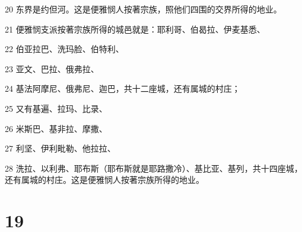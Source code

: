\par 20 东界是约但河。这是便雅悯人按著宗族，照他们四围的交界所得的地业。
\par 21 便雅悯支派按著宗族所得的城邑就是：耶利哥、伯曷拉、伊麦基悉、
\par 22 伯亚拉巴、洗玛脸、伯特利、
\par 23 亚文、巴拉、俄弗拉、
\par 24 基法阿摩尼、俄弗尼、迦巴，共十二座城，还有属城的村庄；
\par 25 又有基遍、拉玛、比录、
\par 26 米斯巴、基非拉、摩撒、
\par 27 利坚、伊利毗勒、他拉拉、
\par 28 洗拉、以利弗、耶布斯（耶布斯就是耶路撒冷）、基比亚、基列，共十四座城，还有属城的村庄。这是便雅悯人按著宗族所得的地业。

\chapter{19}


